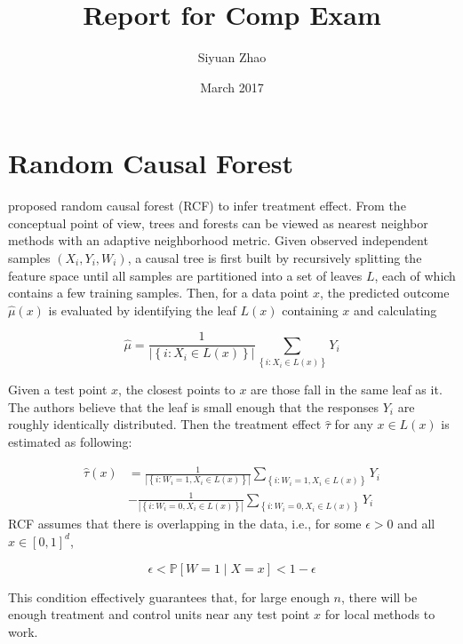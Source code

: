 \documentclass{article}
\title{Report for Comp Exam}
\author{Siyuan Zhao}
\date{March 2017}
\begin{document}
\maketitle

\section{Random Causal Forest}
\cite{wager2015estimation} proposed random causal forest (RCF) to
infer treatment effect. From the conceptual point of view, trees and forests can be viewed as
nearest neighbor methods with an adaptive neighborhood metric. Given
observed independent samples $(X_i, Y_i, W_i)$, a causal tree is first
built by recursively splitting the feature space until all samples are
partitioned into a set of leaves $L$, each of which contains a few
training samples. Then, for a data point $x$, the predicted outcome $\hat{\mu}(x)$
is evaluated by identifying the leaf $L(x)$ containing $x$ and
calculating

$$\hat{\mu} = \frac{1}{\left | \left \{ i: X_i \in L(x) \right \}
  \right |} \sum_{\left \{ i: X_i \in L(x) \right \}} Y_i$$

Given a test point $x$, the closest points to $x$ are those fall in the same
leaf as it. The authors believe that the leaf is small enough that the
responses $Y_i$ are roughly identically distributed. Then the
treatment effect $\hat{\tau}$ for any $x \in L(x)$ is estimated as
following:

\begin{align*}
\hat{\tau}(x) & = \frac{1}{\left | \left \{ i: W_i=1, X_i \in L(x) \right \}
  \right |} \sum_{\left \{ i: W_i = 1, X_i \in L(x) \right \}} Y_i \\ & - \frac{1}{\left | \left \{ i: W_i=0, X_i \in L(x) \right \}
  \right |} \sum_{\left \{ i: W_i = 0, X_i \in L(x) \right \}} Y_i
\end{align*}
RCF assumes that
there is overlapping in the data, i.e., for some $\epsilon > 0$ and
all $x \in \left [ 0, 1\right ]^d$,

$$\epsilon < \mathbb{P}\left [ W=1 \mid X=x \right ] < 1-\epsilon$$

This condition effectively guarantees that, for large enough $n$,
there will be enough treatment and control units near any test point
$x$ for local methods to work.
\end{document}
